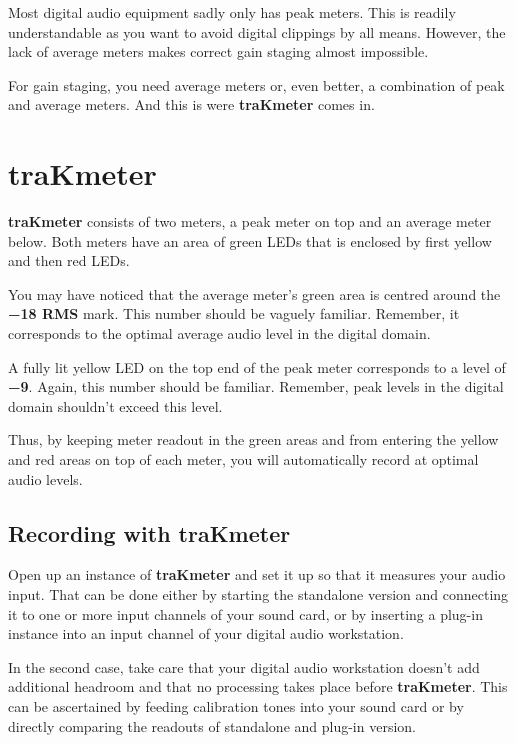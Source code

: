 Most digital audio equipment sadly only has peak meters.  This is
readily understandable as you want to avoid digital clippings by all
means.  However, the lack of average meters makes correct gain staging
almost impossible.

For gain staging, you need average meters or, even better, a
combination of peak and average meters.  And this is were
\textbf{traKmeter} comes in.

\chapter{traKmeter}
\label{chap:trakmeter}

\textbf{traKmeter} consists of two meters, a peak meter on top and an
average meter below.  Both meters have an area of green LEDs that is
enclosed by first yellow and then red LEDs.

You may have noticed that the average meter's green area is centred
around the \textbf{\SI{-18}{\dBFS} RMS} mark.  This number should be
vaguely familiar.  Remember, it corresponds to the optimal average
audio level in the digital domain.

A fully lit yellow LED on the top end of the peak meter corresponds to
a level of \textbf{\SI{-9}{\dBFS}}.  Again, this number should be
familiar.  Remember, peak levels in the digital domain shouldn't
exceed this level.

Thus, by keeping meter readout in the green areas and from entering
the yellow and red areas on top of each meter, you will automatically
record at optimal audio levels.

\newpage %

\section{Recording with traKmeter}
\label{sec:recording_with_trakmeter}

Open up an instance of \textbf{traKmeter} and set it up so that it
measures your audio input.  That can be done either by starting the
standalone version and connecting it to one or more input channels of
your sound card, or by inserting a plug-in instance into an input
channel of your digital audio workstation.

In the second case, take care that your digital audio workstation
doesn't add additional headroom and that no processing takes place
before \textbf{traKmeter}.  This can be ascertained by feeding
calibration tones into your sound card or by directly comparing the
readouts of standalone and plug-in version.

